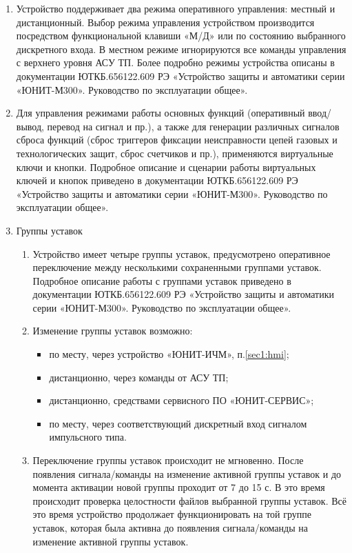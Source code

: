 \begin{enumerate}
\item
Устройство поддерживает два режима оперативного управления: местный и дистанционный. Выбор режима управления устройством производится посредством функциональной клавиши «М/Д» или по состоянию выбранного дискретного входа. В местном режиме игнорируются все команды управления с верхнего уровня АСУ ТП. Более подробно режимы устройства описаны в документации ЮТКБ.656122.609 РЭ «Устройство защиты и автоматики серии «ЮНИТ-М300». Руководство по эксплуатации общее».
\item
Для управления режимами работы основных функций (оперативный ввод/вывод, перевод на сигнал и пр.), а также для генерации различных сигналов сброса функций (сброс триггеров фиксации неисправности цепей газовых и технологических защит, сброс счетчиков и пр.), применяются виртуальные ключи и кнопки. Подробное описание и сценарии работы виртуальных ключей и кнопок приведено в документации ЮТКБ.656122.609 РЭ «Устройство защиты и автоматики серии «ЮНИТ-М300». Руководство по эксплуатации общее». 

\item Группы уставок
\begin{enumerate}

\item Устройство имеет четыре группы уставок, предусмотрено оперативное переключение между несколькими сохраненными группами уставок. Подробное описание работы с группами уставок приведено в документации ЮТКБ.656122.609 РЭ «Устройство защиты и автоматики серии «ЮНИТ-М300». Руководство по эксплуатации общее».

\item
Изменение группы уставок возможно:
\begin{itemize}
    \item по месту, через устройство «ЮНИТ-ИЧМ», п.\ref{sec1:hmi};
    \item дистанционно, через команды от АСУ ТП;
    \item дистанционно, средствами сервисного ПО «ЮНИТ-СЕРВИС»;
    \item по месту, через соответствующий дискретный вход сигналом импульсного типа.
\end{itemize}
\item
Переключение группы уставок происходит не мгновенно. После появления сигнала/команды на изменение активной группы уставок и до момента активации новой группы проходит от 7 до 15 с. В это
время происходит проверка целостности файлов выбранной группы уставок. Всё это время устройство продолжает функционировать на той группе уставок, которая была активна до появления сигнала/команды на изменение активной группы уставок.


\end{enumerate}
\end{enumerate}
